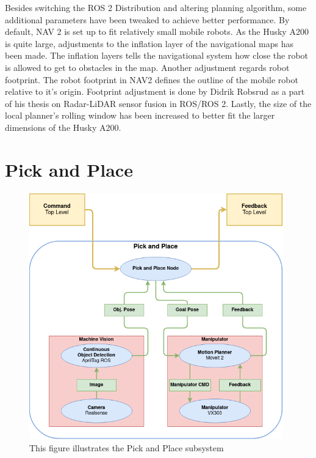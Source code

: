 Besides switching the ROS 2 Distribution and altering planning algorithm, some additional parameters have been tweaked to achieve better performance. By default, NAV 2 is set up to fit relatively small mobile robots. As the Husky A200 is quite large, adjustments to the inflation layer of the navigational maps has been made. The inflation layers tells the navigational system how close the robot is allowed to get to obstacles in the map. Another adjustment regards robot footprint. The robot footprint in NAV2 defines the outline of the mobile robot relative to it's origin. Footprint adjustment is done by Didrik Robsrud as a part of his thesis on Radar-LiDAR sensor fusion in ROS/ROS 2. Lastly, the size of the local planner's rolling window has been increased to better fit the larger dimensions of the Husky A200.

\section{Pick and Place} \label{M:PickAndPlace}

\begin{figure}[htp]
  \centering
  \includegraphics[width = 0.98\textwidth]{Figures/figPickAndPlaceMethod.drawio.png}
  \caption{This figure illustrates the Pick and Place subsystem}
  \label{fig:M:PAP:PickAndPlaceMethod}
\end{figure}


